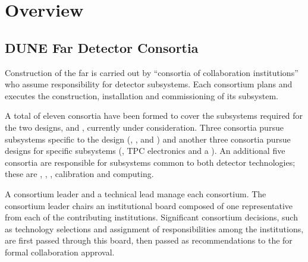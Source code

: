 \chapter{Overview}
\label{vl:tc-overview}





\section{DUNE Far Detector Consortia}
\label{sec:consortia}


Construction of the  far  is carried out by
``consortia of collaboration institutions'' who assume responsibility
for detector subsystems.  Each consortium plans and
executes the construction, installation and commissioning of its 
subsystem.


A total
of eleven  consortia have been formed to cover the
subsystems required for the two  designs,  and , currently under
consideration.  Three  consortia pursue subsystems specific to
the  design (, , and ) and another three consortia pursue designs for 
specific subsystems (, TPC electronics and a  ).  An additional five consortia are responsible for subsystems common to both detector
technologies; these are , , , calibration and computing.



A consortium leader
and a technical lead manage each consortium.  The consortium leader chairs an institutional
board composed of one representative from each of the contributing 
institutions.  Significant 
consortium decisions, such as technology selections and assignment of
responsibilities among the institutions, are first passed
through this board,  then passed as
recommendations to the   for formal collaboration approval. 


